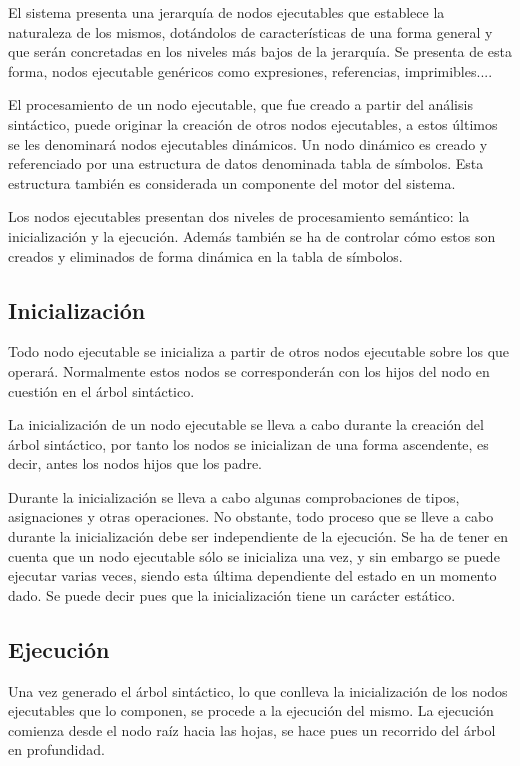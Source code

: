 El sistema presenta una jerarquía de nodos ejecutables que establece la naturaleza de los mismos, dotándolos de características de una forma general y que serán concretadas en los niveles más
bajos de la jerarquía. Se presenta de esta forma, nodos ejecutable genéricos como expresiones, referencias, imprimibles....

El procesamiento de un nodo ejecutable, que fue creado a partir del análisis sintáctico, puede originar la creación de otros nodos ejecutables, a estos 
últimos se les denominará nodos ejecutables dinámicos. Un nodo dinámico es creado y referenciado por una estructura de datos denominada tabla de símbolos. 
Esta estructura también es considerada un componente del motor del sistema.

Los nodos ejecutables presentan dos niveles de procesamiento semántico: la inicialización y la ejecución. Además también se ha de controlar cómo estos son creados y eliminados de 
forma dinámica en la tabla de símbolos. 



\subsection{Inicialización}
Todo nodo ejecutable se inicializa a partir de otros nodos ejecutable sobre los que operará. Normalmente estos nodos se corresponderán con los hijos del nodo en cuestión en el árbol sintáctico. 

La inicialización de un nodo ejecutable se lleva a cabo durante la creación del árbol sintáctico, por tanto los nodos se inicializan de una forma ascendente, es decir,
antes los nodos hijos que los padre.

Durante la inicialización se lleva a cabo algunas comprobaciones de tipos, asignaciones y otras operaciones. No obstante, todo proceso que se lleve a cabo durante la
inicialización debe ser independiente de la ejecución. Se ha de tener en cuenta que un nodo ejecutable sólo se inicializa una vez, y sin embargo se puede ejecutar varias
veces, siendo esta última dependiente del estado en un momento dado. Se puede decir pues que la inicialización tiene un carácter estático.

\subsection{Ejecución}
Una vez generado el árbol sintáctico, lo que conlleva la inicialización de los nodos ejecutables que lo componen, se procede a la ejecución del mismo. La ejecución comienza desde el 
nodo raíz hacia las hojas, se hace pues un recorrido del árbol en profundidad.

